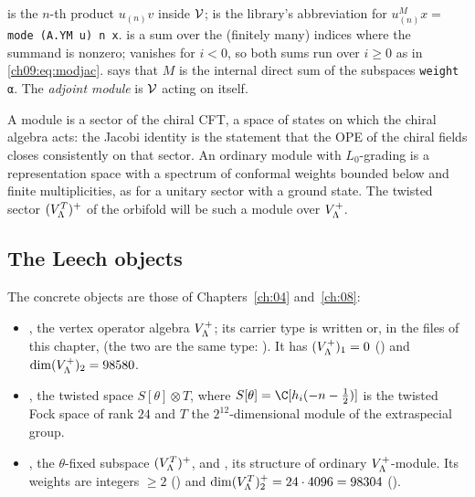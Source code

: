 \begin{dictionary}
 is the $n$-th product $u_{(n)}v$ inside $\mathcal{V}$;  is
the library's abbreviation for $u^M_{(n)}x=$ \texttt{mode (A.YM u) n x}.  is a sum
over the (finitely many) indices where the summand is nonzero;  vanishes for $i<0$,
so both sums run over $i\ge0$ as in \eqref{ch09:eq:modjac}. 
says that $M$ is the internal direct sum of the subspaces \texttt{weight α}. The
\emph{adjoint module}  is $\mathcal{V}$ acting on itself.
\end{dictionary}

\begin{physics}
A module is a sector of the chiral CFT, a space of states on which the chiral algebra acts: the Jacobi identity is the statement that the OPE of the chiral fields closes consistently on that sector. An ordinary module with $L_0$-grading is a representation space with a spectrum of conformal weights bounded below and finite multiplicities, as for a unitary sector with a ground state. The twisted sector $(V_{\Lambda}^{T})^{+}$ of the orbifold will be such a module over $V_{\Lambda}^{+}$.
\end{physics}

\subsection{The Leech objects}\label{ch09:sec:leechobjects}

The concrete objects are those of Chapters~\ref{ch:04} and~\ref{ch:08}:
\begin{itemize}
\item {}, the vertex operator algebra
$V_{\Lambda}^{+}$; its carrier type is written  or, in the files of this chapter,
 (the two are the same type: ).
It has $(V_{\Lambda}^{+})_1=0$ () and $\dim(V_{\Lambda}^{+})_2=98580$.
\item {}, the twisted space $S[\theta]\otimes T$, where
$S[\theta]=\C[h_i(-n-\tfrac12)]$ is the twisted Fock space of rank $24$ and $T$ the
$2^{12}$-dimensional module of the extraspecial group.
\item {}, the $\theta$-fixed subspace $(V_{\Lambda}^{T})^{+}$, and
, its structure of ordinary
$V_{\Lambda}^{+}$-module. Its weights are integers $\ge2$ () and
$\dim(V_{\Lambda}^{T})^{+}_{2}=24\cdot4096=98304$ ().
\end{itemize}

